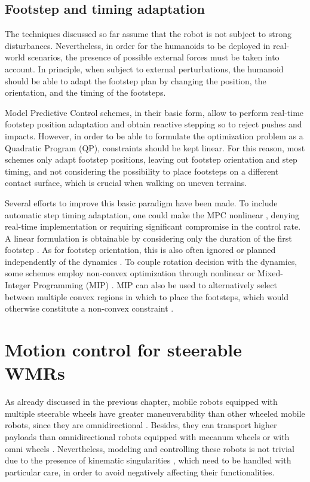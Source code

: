 \subsection{Footstep and timing adaptation}
The techniques discussed so far assume that the robot is not subject to strong 
disturbances. Nevertheless, in order for the humanoids to be deployed in
real-world scenarios, the presence of possible external forces must be taken 
into account. In principle, when subject
to external perturbations, the humanoid should be able to adapt the footstep plan
by changing the position, the orientation, and the timing of the footsteps.

Model Predictive Control schemes, in their basic form, allow to
perform real-time footstep position adaptation \cite{Herdt2010IROS} and obtain
reactive stepping so to reject pushes and impacts. However, in order to be
able to formulate the optimization problem as a Quadratic Program (QP),
constraints should be kept linear. For this reason, most schemes only adapt
footstep positions, leaving out footstep orientation and step timing, and not
considering the possibility to place footsteps on a different contact surface,
which is crucial when walking on uneven terrains.

Several efforts to improve this basic paradigm have been made. To include
automatic step timing adaptation, one could make the MPC nonlinear
\cite{Maximo2020MIQPAutomaticWalking,Bohorquez2017AdaptiveStepDuration,
Caron2017Whentomakeastep,Aurelien2014IROS}, denying real-time implementation or
requiring significant compromise in the control rate. A linear formulation is
obtainable by considering only the duration of the first footstep
\cite{Smaldone2021FeasibilityDrivenSTA,Khadiv2020StepTimingAdaptation}.
As for footstep orientation, this is also often ignored or planned independently
of the dynamics \cite{Herdt2010IROS}. To couple rotation decision with the
dynamics, some schemes employ non-convex optimization through nonlinear
\cite{Naveau2017RAL,Bohorquez2018AdaptiveStepRotation} or Mixed-Integer
Programming (MIP) \cite{Maximo2020MIQPAutomaticWalking}.
MIP can also be used to alternatively select between multiple convex regions
in which to place the footsteps, which would otherwise constitute a
non-convex constraint \cite{Aceituno2018RAL,Deits2014FootstepPlanningMIQCQP}.

\section{Motion control for steerable WMRs}
As already discussed in the previous chapter, mobile robots equipped with
multiple steerable wheels
have greater maneuverability than other wheeled mobile robots, since they are
omnidirectional \cite{RobuffoGiordano2009ICRA}. Besides, they can transport
higher payloads than omnidirectional robots equipped with mecanum wheels
\cite{Dickerson1991ControlOminidirectionalRobotwithMecaumWheels} or
with omni wheels \cite{Blumrich1974OmnidirectionalWheel}.
Nevertheless, modeling and controlling these robots is not
trivial due to the presence of kinematic singularities \cite{Sorour2017RAL},
which need to be handled with particular care, in order to avoid negatively
affecting their functionalities.

